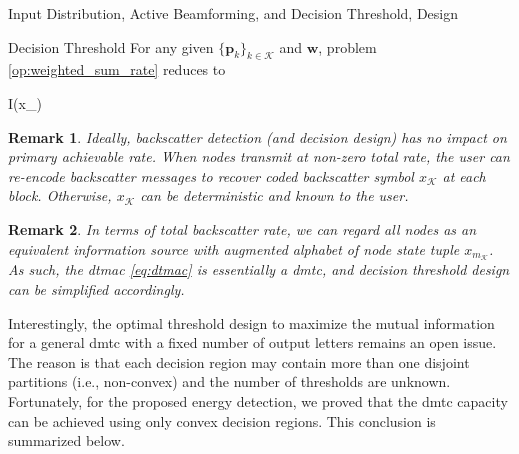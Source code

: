 \documentclass[journal]{IEEEtran}
\newtheorem{remark}{Remark}
\begin{document}
\begin{section}{Input Distribution, Active Beamforming, and Decision Threshold, Design}
	\begin{subsection}{Decision Threshold}
		For any given $\{\boldsymbol{p}_k\}_{k \in \mathcal{K}}$ and $\boldsymbol{w}$, problem \eqref{op:weighted_sum_rate} reduces to
		\begin{maxi!}
			{}{I(x_{})}{\label{op:decision_threshold}}{\label{ob:decision_threshold}}
		\end{maxi!}

		\begin{remark}
			Ideally, backscatter detection (and decision design) has no impact on primary achievable rate.
			When nodes transmit at non-zero total rate, the user can re-encode backscatter messages to recover coded backscatter symbol $x_{\mathcal{K}}$ at each block. Otherwise, $x_{\mathcal{K}}$ can be deterministic and known to the user.
		\end{remark}

		\begin{remark}
			In terms of total backscatter rate, we can regard all nodes as an equivalent information source with augmented alphabet of node state tuple $x_{m_{\mathcal{K}}}$.
			As such, the \gls{dtmac} \eqref{eq:dtmac} is essentially a \gls{dmtc}, and decision threshold design can be simplified accordingly.
		\end{remark}

		Interestingly, the optimal threshold design to maximize the mutual information for a general \gls{dmtc} with a fixed number of output letters remains an open issue.
		The reason is that each decision region may contain more than one disjoint partitions (i.e., non-convex) and the number of thresholds are unknown.
		Fortunately, for the proposed energy detection, we proved that the \gls{dmtc} capacity can be achieved using only convex decision regions.
		This conclusion is summarized below.


\end{subsection}
\end{section}
\end{document}
